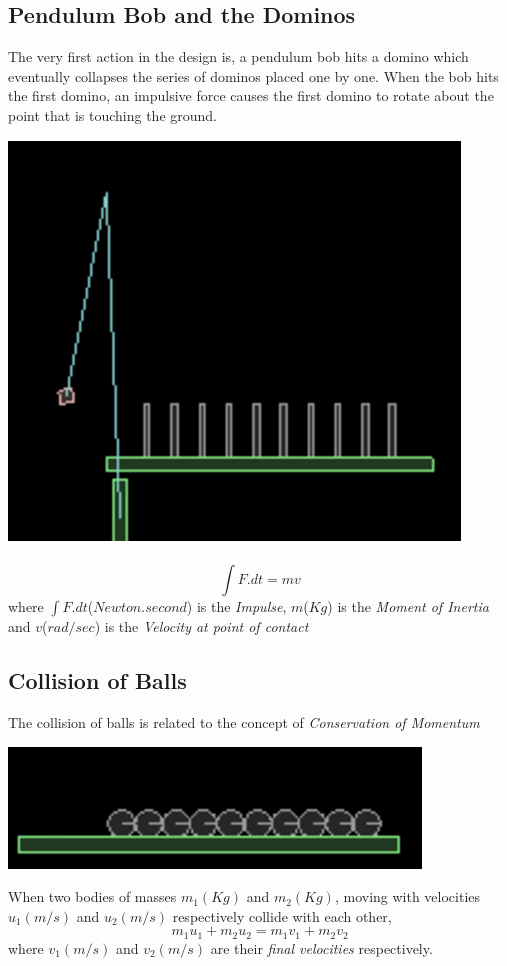 \documentclass[11]{article}
\begin{document}
\subsection{Pendulum Bob and the Dominos}
The very first action in the design is, a pendulum bob hits a domino which eventually collapses the series of dominos placed one by one. When the bob hits the first domino, an impulsive force causes the first domino to rotate about the point that is touching the ground.
\begin{center}
\includegraphics[scale=0.6]{1}
\end{center}
\begin{equation}
\int F.dt=mv
\end{equation} 
where $\int F.dt$($Newton.second$) is the \textit{Impulse}, $m$($Kg$) is the \textit{Moment of Inertia} and $v$($rad/sec$) is the \textit{Velocity at point of contact}

\subsection{Collision of Balls}
The collision of balls is related to the concept of \emph{Conservation of Momentum}
\begin{center}
\includegraphics[scale=0.6]{2}
\end{center}
When two bodies of masses $m_{1}(Kg)$ and $m_{2}(Kg)$, moving with velocities $u_{1}(m/s)$ and $u_{2}(m/s)$ respectively collide with each other,
\begin{equation}
m_{1}u_{1}+m_{2}u_{2}=m_{1}v_{1}+m_{2}v_{2}
\end{equation}
where $v_{1}(m/s)$ and $v_{2}(m/s)$ are their \textit{final velocities} respectively.
\newline
\end{document}

